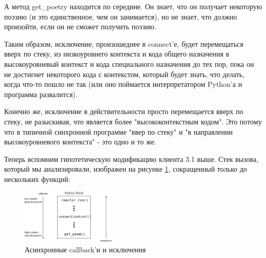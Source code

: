 А метод get\_poetry находится по середине. Он знает, что он получает 
некоторую поэзию (и это единственное, чем он занимается), но не знает, 
что должно произойти, если он не сможет получить поэзию.
 

Таким образом, исключение, произошеднее в connect'е, будет 
перемещаться вверх по стеку, из низкоуровнего контекста и 
кода общего назначения в высокоуровневый контекст и кода 
специального назначения до тех пор, пока он не достигнет 
некоторого кода с контекстом, который будет знать, что делать, 
когда что-то пошло не так (или оно поймается интерпретатором 
Python'а и программа развалится).
 

Конечно же, исключение в действительности просто перемещается вверх 
по стеку, не разыскивая, что является более "высококонтекстным кодом". 
Это потому что в типичной синхронной программе "ввер по стеку" и 
"в направлении высокоуровневого контекста" - это одно и то же.

\eject

Теперь вспомним гипотетическую модификацию клиента 3.1 выше. 
Стек вызова, который мы анализировали, изображен на рисунке \ref{fig:async-exceptions}, 
сокращенный только до нескольких функций:

\begin{figure}[h]
\begin{center}
    \includegraphics[width=0.4\textwidth]{images/async-exceptions.pdf}
    \caption{Асинхронные callback'и и исключения\label{fig:async-exceptions}}
\end{center}
\end{figure}

